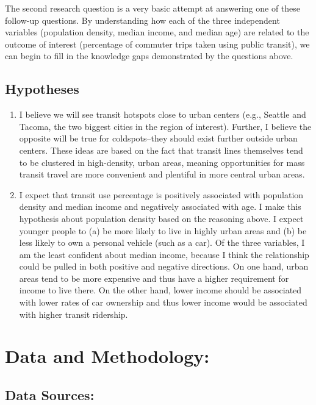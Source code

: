 \documentclass[
]{article}
\providecommand{\tightlist}{%
  \setlength{\itemsep}{0pt}\setlength{\parskip}{0pt}}
\begin{document}
The second research question is a very basic attempt at answering one of
these follow-up questions. By understanding how each of the three
independent variables (population density, median income, and median
age) are related to the outcome of interest (percentage of commuter
trips taken using public transit), we can begin to fill in the knowledge
gaps demonstrated by the questions above.

\subsection{Hypotheses}\label{hypotheses}

\begin{enumerate}
\def\labelenumi{\arabic{enumi}.}
\tightlist
\item
  I believe we will see transit hotspots close to urban centers (e.g.,
  Seattle and Tacoma, the two biggest cities in the region of interest).
  Further, I believe the opposite will be true for coldspots--they
  should exist further outside urban centers. These ideas are based on
  the fact that transit lines themselves tend to be clustered in
  high-density, urban areas, meaning opportunities for mass transit
  travel are more convenient and plentiful in more central urban areas.
\item
  I expect that transit use percentage is positively associated with
  population density and median income and negatively associated with
  age. I make this hypothesis about population density based on the
  reasoning above. I expect younger people to (a) be more likely to live
  in highly urban areas and (b) be less likely to own a personal vehicle
  (such as a car). Of the three variables, I am the least confident
  about median income, because I think the relationship could be pulled
  in both positive and negative directions. On one hand, urban areas
  tend to be more expensive and thus have a higher requirement for
  income to live there. On the other hand, lower income should be
  associated with lower rates of car ownership and thus lower income
  would be associated with higher transit ridership.
\end{enumerate}

\section{Data and Methodology:}\label{data-and-methodology}

\subsection{Data Sources:}\label{data-sources}
\end{document}
